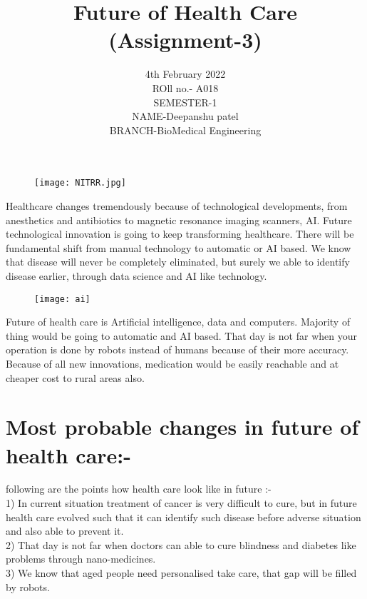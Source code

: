 \documentclass[12pt]{article}
\title{\textbf{Future of Health Care}\\(Assignment-3)}
\date{4th February 2022\\ROll no.- A018\\SEMESTER-1\\NAME-Deepanshu patel\\BRANCH-BioMedical Engineering}
\begin{document}
\begin{figure}
\centering
\texttt{[image: NITRR.jpg]}
\end{figure}

\maketitle

\clearpage

Healthcare changes tremendously because of technological developments, from anesthetics and antibiotics to magnetic resonance imaging scanners, AI. Future technological innovation is going to keep transforming healthcare. There will be fundamental shift from manual technology to automatic or AI based. We know that disease will never be completely eliminated, but surely we able to identify disease earlier, through data science and AI like technology. \


\begin{figure}[h]
\centering
\texttt{[image: ai]}
\end{figure}

Future of health care is Artificial intelligence, data and computers. Majority of thing would be going to automatic and AI based. That day is not far when your operation is done by robots instead of humans because of their more accuracy. Because of all new innovations, medication would be easily reachable and at cheaper cost to rural areas also. 




\clearpage

\section{Most probable changes in future of health care:-}

following are the points how health care look like in future :-\\

  
   
   1) In current situation treatment of cancer is very  difficult to cure, but in future health care evolved such that it can identify  such disease before adverse situation and also able to prevent it.\\
  
2) That day is not far when doctors can able to cure blindness and diabetes like problems through nano-medicines.\\

3) We know that aged people need personalised take care, that gap will be filled by robots.\\
\end{document}
